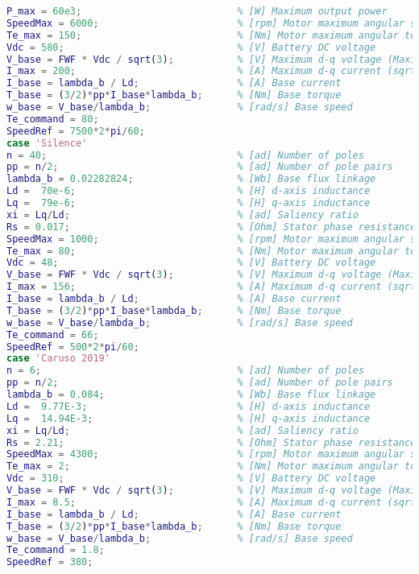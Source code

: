 \begin{lstlisting}[language=Matlab, basicstyle=\ttfamily\small, breaklines=true, frame=single]
P_max = 60e3;                           % [W] Maximum output power
SpeedMax = 6000;                        % [rpm] Motor maximum angular speed
Te_max = 150;                           % [Nm] Motor maximum angular torque
Vdc = 580;                              % [V] Battery DC voltage
V_base = FWF * Vdc / sqrt(3);           % [V] Maximum d-q voltage (Maximum Torque per Voltage Flux-Weakening strategy with speed limiter for PMSM drives, 2020)
I_max = 200;                            % [A] Maximum d-q current (sqrt(i_d^2+i_q^2))
I_base = lambda_b / Ld;                 % [A] Base current
T_base = (3/2)*pp*I_base*lambda_b;      % [Nm] Base torque
w_base = V_base/lambda_b;               % [rad/s] Base speed
Te_command = 80;
SpeedRef = 7500*2*pi/60;  
case 'Silence'
n = 40;                                 % [ad] Number of poles 
pp = n/2;                               % [ad] Number of pole pairs
lambda_b = 0.02282824;                  % [Wb] Base flux linkage
Ld =  70e-6;                            % [H] d-axis inductance
Lq =  79e-6;                            % [H] q-axis inductance
xi = Lq/Ld;                             % [ad] Saliency ratio
Rs = 0.017;                             % [Ohm] Stator phase resistance (phase-to-phase/2)
SpeedMax = 1000;                        % [rpm] Motor maximum angular speed
Te_max = 80;                            % [Nm] Motor maximum angular torque
Vdc = 48;                               % [V] Battery DC voltage
V_base = FWF * Vdc / sqrt(3);           % [V] Maximum d-q voltage (Maximum Torque per Voltage Flux-Weakening strategy with speed limiter for PMSM drives, 2020)
I_max = 156;                            % [A] Maximum d-q current (sqrt(i_d^2+i_q^2))      
I_base = lambda_b / Ld;                 % [A] Base current
T_base = (3/2)*pp*I_base*lambda_b;      % [Nm] Base torque
w_base = V_base/lambda_b;               % [rad/s] Base speed
Te_command = 66;
SpeedRef = 500*2*pi/60;
case 'Caruso 2019'
n = 6;                                  % [ad] Number of poles 
pp = n/2;                               % [ad] Number of pole pairs
lambda_b = 0.084;                       % [Wb] Base flux linkage
Ld =  9.77E-3;                          % [H] d-axis inductance
Lq =  14.94E-3;                         % [H] q-axis inductance
xi = Lq/Ld;                             % [ad] Saliency ratio
Rs = 2.21;                              % [Ohm] Stator phase resistance (phase-to-phase/2)
SpeedMax = 4300;                        % [rpm] Motor maximum angular speed
Te_max = 2;                             % [Nm] Motor maximum angular torque
Vdc = 310;                              % [V] Battery DC voltage
V_base = FWF * Vdc / sqrt(3);           % [V] Maximum d-q voltage (Maximum Torque per Voltage Flux-Weakening strategy with speed limiter for PMSM drives, 2020)
I_max = 8.5;                            % [A] Maximum d-q current (sqrt(i_d^2+i_q^2))
I_base = lambda_b / Ld;                 % [A] Base current
T_base = (3/2)*pp*I_base*lambda_b;      % [Nm] Base torque
w_base = V_base/lambda_b;               % [rad/s] Base speed
Te_command = 1.8;
SpeedRef = 380;


\end{lstlisting}
